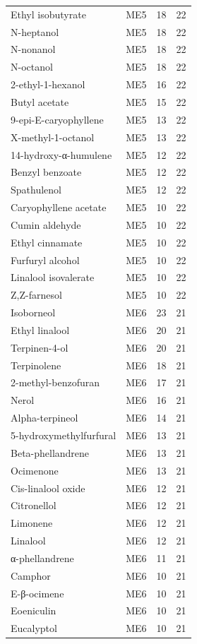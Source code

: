 {\begin{longtable}{lrrr}
Ethyl isobutyrate & ME5 & 18 & 22 \\
N-heptanol & ME5 & 18 & 22 \\
N-nonanol & ME5 & 18 & 22 \\
N-octanol & ME5 & 18 & 22 \\
2-ethyl-1-hexanol & ME5 & 16 & 22 \\
Butyl acetate & ME5 & 15 & 22 \\
9-epi-E-caryophyllene & ME5 & 13 & 22 \\
X-methyl-1-octanol & ME5 & 13 & 22 \\
14-hydroxy-α-humulene & ME5 & 12 & 22 \\
Benzyl benzoate & ME5 & 12 & 22 \\
Spathulenol & ME5 & 12 & 22 \\
Caryophyllene acetate & ME5 & 10 & 22 \\
Cumin aldehyde & ME5 & 10 & 22 \\
Ethyl cinnamate & ME5 & 10 & 22 \\
Furfuryl alcohol & ME5 & 10 & 22 \\
Linalool isovalerate & ME5 & 10 & 22 \\
Z,Z-farnesol & ME5 & 10 & 22 \\
Isoborneol & ME6 & 23 & 21 \\
Ethyl linalool & ME6 & 20 & 21 \\
Terpinen-4-ol & ME6 & 20 & 21 \\
Terpinolene & ME6 & 18 & 21 \\
2-methyl-benzofuran & ME6 & 17 & 21 \\
Nerol & ME6 & 16 & 21 \\
Alpha-terpineol & ME6 & 14 & 21 \\
5-hydroxymethylfurfural & ME6 & 13 & 21 \\
Beta-phellandrene & ME6 & 13 & 21 \\
Ocimenone & ME6 & 13 & 21 \\
Cis-linalool oxide & ME6 & 12 & 21 \\
Citronellol & ME6 & 12 & 21 \\
Limonene & ME6 & 12 & 21 \\
Linalool & ME6 & 12 & 21 \\
α-phellandrene & ME6 & 11 & 21 \\
Camphor & ME6 & 10 & 21 \\
E-β-ocimene & ME6 & 10 & 21 \\
Eoeniculin & ME6 & 10 & 21 \\
Eucalyptol & ME6 & 10 & 21 \\

\end{longtable}}
